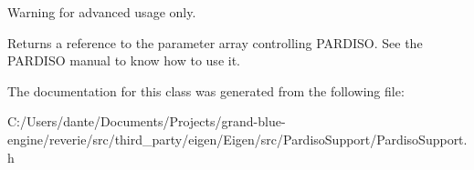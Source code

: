 \begin{DoxyWarning}{Warning}
for advanced usage only. 
\end{DoxyWarning}
\begin{DoxyReturn}{Returns}
a reference to the parameter array controlling P\+A\+R\+D\+I\+SO. See the P\+A\+R\+D\+I\+SO manual to know how to use it. 
\end{DoxyReturn}


The documentation for this class was generated from the following file\+:\begin{DoxyCompactItemize}
\item 
C\+:/\+Users/dante/\+Documents/\+Projects/grand-\/blue-\/engine/reverie/src/third\+\_\+party/eigen/\+Eigen/src/\+Pardiso\+Support/Pardiso\+Support.\+h\end{DoxyCompactItemize}
